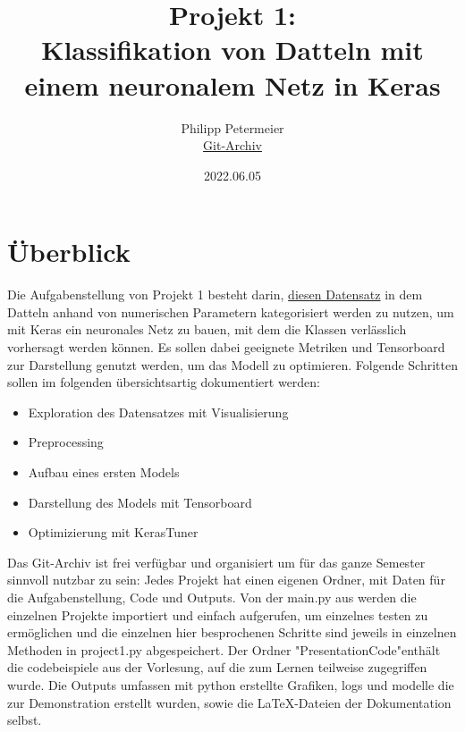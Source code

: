 \documentclass[letterpaper,10pt]{article}
\title{Projekt 1: \\ Klassifikation von Datteln mit einem neuronalem Netz in Keras}
\author{Philipp Petermeier \\
    \href{https://github.com/PPetermeier/SoSe2022_Machine_Learning}{Git-Archiv}
    }
\date{2022.06.05}
\begin{document}
\maketitle
\newpage
\renewcommand{\contentsname}{Inhaltsverzeichnis}
\tableofcontents
\newpage

\section{Überblick}
    Die Aufgabenstellung von Projekt 1 besteht darin, \href{https://www.kaggle.com/code/kaushikjegannathan/date-fruit-classification-using-ann}{diesen Datensatz} \cite{Koklu.2021}
    in dem Datteln anhand von numerischen Parametern kategorisiert werden zu nutzen, um mit Keras\cite{chollet2015keras} ein neuronales Netz zu bauen, mit dem die Klassen verlässlich vorhersagt werden können. Es sollen dabei geeignete Metriken und Tensorboard zur Darstellung genutzt werden, um das Modell zu optimieren. Folgende Schritten sollen im folgenden übersichtsartig dokumentiert werden:
    \begin{itemize}
        \item Exploration des Datensatzes mit Visualisierung
        \item Preprocessing
        \item Aufbau eines ersten Models
        \item Darstellung des Models mit Tensorboard
        \item Optimizierung mit KerasTuner
    \end{itemize}
    Das Git-Archiv ist frei verfügbar und organisiert um für das ganze Semester sinnvoll nutzbar zu sein: Jedes Projekt hat einen eigenen Ordner, mit Daten für die Aufgabenstellung, Code und Outputs. Von der main.py aus werden die einzelnen Projekte importiert und einfach aufgerufen, um einzelnes testen zu ermöglichen und die einzelnen hier besprochenen Schritte sind jeweils in einzelnen Methoden in project1.py abgespeichert. Der Ordner "PresentationCode"enthält die codebeispiele aus der Vorlesung, auf die zum Lernen teilweise zugegriffen wurde. Die Outputs umfassen mit python erstellte Grafiken, logs und modelle die zur Demonstration erstellt wurden, sowie die LaTeX-Dateien der Dokumentation selbst.


\newpage
\end{document}
